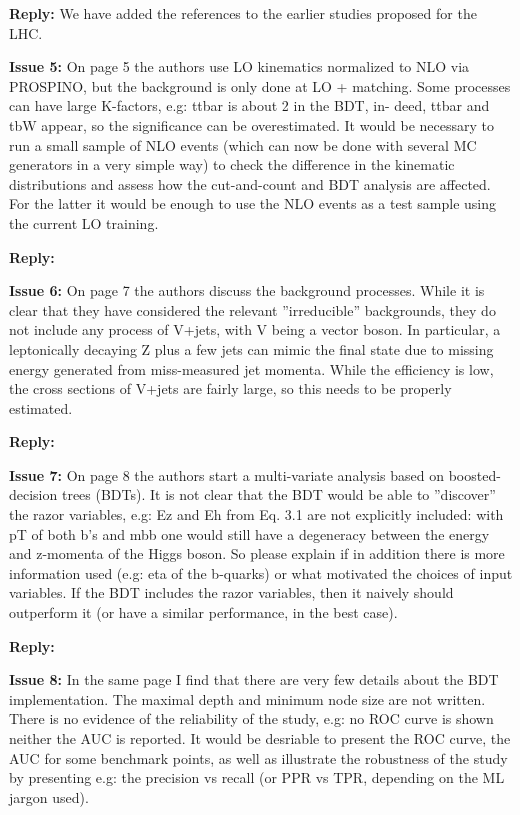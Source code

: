 \documentclass[12pt]{article}
\newcommand{\issue}[1]{\bigskip\noindent\textbf{\color{Maroon}Issue #1: }}
\newcommand{\reply}{\medskip\noindent\textbf{\color{RoyalBlue}Reply:}}
\begin{document}
\reply{} We have added the references to the earlier studies proposed for the
LHC.

\issue{5} On page 5 the authors use LO kinematics normalized
to NLO via PROSPINO, but the background is only done at LO + matching. Some
processes can have large K-factors, e.g: ttbar is about 2 in the BDT, in- deed,
ttbar and tbW appear, so the significance can be overestimated. It would be
necessary to run a small sample of NLO events (which can now be done with
several MC generators in a very simple way) to check the difference in the
kinematic distributions and assess how the cut-and-count and BDT analysis are
affected. For the latter it would be enough to use the NLO events as a test
sample using the current LO training.

\reply{} 

\issue{6} On page 7 the authors discuss the background
processes. While it is clear that they have considered the relevant
”irreducible” backgrounds, they do not include any process of V+jets, with V
being a vector boson. In particular, a leptonically decaying Z plus a few jets
can mimic the final state due to missing energy generated from miss-measured
jet momenta. While the efficiency is low, the cross sections of V+jets are
fairly large, so this needs to be properly estimated.

\reply{} 

\issue{7} On page 8 the authors start a multi-variate analysis
based on boosted- decision trees (BDTs). It is not clear that the BDT would be
able to ”discover” the razor variables, e.g: Ez and Eh from Eq. 3.1 are not
explicitly included: with pT of both b’s and mbb one would still have a
degeneracy between the energy and z-momenta of the Higgs boson. So please
explain if in addition there is more information used (e.g: eta of the
b-quarks) or what motivated the choices of input variables. If the BDT includes
the razor variables, then it naively should outperform it (or have a similar
performance, in the best case).

\reply{} 

\issue{8} In the same page I find that there are very few details
about the BDT implementation. The maximal depth and minimum node size are not
written. There is no evidence of the reliability of the study, e.g: no ROC
curve is shown neither the AUC is reported. It would be desriable to present
the ROC curve, the AUC for some benchmark points, as well as illustrate the
robustness of the study by presenting e.g: the precision vs recall (or PPR vs
TPR, depending on the ML jargon used).
\end{document}
